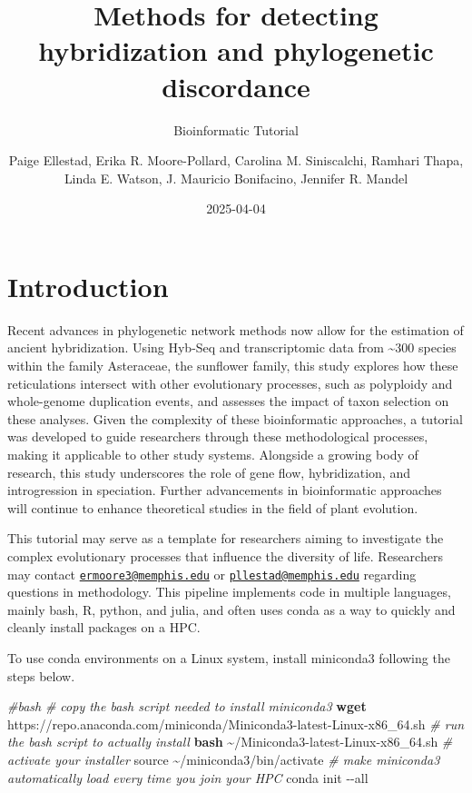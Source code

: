 \documentclass[
  12pt,
]{article}
\title{Methods for detecting hybridization and phylogenetic discordance}
\subtitle{Bioinformatic Tutorial}
\author{Paige Ellestad, Erika R. Moore-Pollard, Carolina M. Siniscalchi, Ramhari Thapa, Linda E. Watson, J. Mauricio Bonifacino, Jennifer R. Mandel}
\date{2025-04-04}
\newenvironment{Shaded}{\begin{snugshade}}{\end{snugshade}}
\newcommand{\AttributeTok}[1]{\textcolor[rgb]{0.13,0.29,0.53}{#1}}
\newcommand{\BuiltInTok}[1]{#1}
\newcommand{\CommentTok}[1]{\textcolor[rgb]{0.56,0.35,0.01}{\textit{#1}}}
\newcommand{\ExtensionTok}[1]{#1}
\newcommand{\FunctionTok}[1]{\textcolor[rgb]{0.13,0.29,0.53}{\textbf{#1}}}
\newcommand{\NormalTok}[1]{#1}
\begin{document}
\maketitle

{
\hypersetup{linkcolor=}
\setcounter{tocdepth}{2}
\tableofcontents
}
\hypertarget{introduction}{%
\section{Introduction}\label{introduction}}

Recent advances in phylogenetic network methods now allow for the estimation of ancient hybridization. Using Hyb-Seq and transcriptomic data from \textasciitilde300 species within the family Asteraceae, the sunflower family, this study explores how these reticulations intersect with other evolutionary processes, such as polyploidy and whole-genome duplication events, and assesses the impact of taxon selection on these analyses. Given the complexity of these bioinformatic approaches, a tutorial was developed to guide researchers through these methodological processes, making it applicable to other study systems. Alongside a growing body of research, this study underscores the role of gene flow, hybridization, and introgression in speciation. Further advancements in bioinformatic approaches will continue to enhance theoretical studies in the field of plant evolution.

This tutorial may serve as a template for researchers aiming to investigate the complex evolutionary processes that influence the diversity of life. Researchers may contact \href{mailto:ermoore3@memphis.edu}{\nolinkurl{ermoore3@memphis.edu}} or \href{mailto:pllestad@memphis.edu}{\nolinkurl{pllestad@memphis.edu}} regarding questions in methodology. This pipeline implements code in multiple languages, mainly bash, R, python, and julia, and often uses conda as a way to quickly and cleanly install packages on a HPC.

To use conda environments on a Linux system, install miniconda3 following the steps below.

\begin{Shaded}
\begin{Highlighting}[]
\CommentTok{\#bash}
\CommentTok{\# copy the bash script needed to install miniconda3}
\FunctionTok{wget}\NormalTok{ https://repo.anaconda.com/miniconda/Miniconda3{-}latest{-}Linux{-}x86\_64.sh }
 \CommentTok{\# run the bash script to actually install}
\FunctionTok{bash}\NormalTok{ \textasciitilde{}/Miniconda3{-}latest{-}Linux{-}x86\_64.sh}
\CommentTok{\# activate your installer}
\BuiltInTok{source}\NormalTok{ \textasciitilde{}/miniconda3/bin/activate }
\CommentTok{\# make miniconda3 automatically load every time you join your HPC}
\ExtensionTok{conda}\NormalTok{ init }\AttributeTok{{-}{-}all} 
\end{Highlighting}
\end{Shaded}
\end{document}
